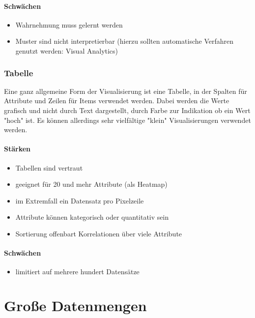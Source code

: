 \paragraph{Schwächen}
	\begin{itemize}
		\item Wahrnehmung muss gelernt werden
		\item Muster sind nicht interpretierbar (hierzu sollten automatische Verfahren genutzt werden: Visual Analytics)
	\end{itemize}

\subsubsection{Tabelle}
	Eine ganz allgemeine Form der Visualisierung ist eine Tabelle, in der Spalten für Attribute und Zeilen für Items verwendet werden. Dabei werden die Werte grafisch und nicht durch Text dargestellt, \bspw durch Farbe zur Indikation ob ein Wert "hoch" ist. Es können allerdings sehr vielfältige "klein" Visualisierungen verwendet werden.

	\paragraph{Stärken}
		\begin{itemize}
			\item Tabellen sind vertraut
			\item geeignet für 20 und mehr Attribute (als Heatmap)
			\item im Extremfall ein Datensatz pro Pixelzeile
			\item Attribute können kategorisch oder quantitativ sein
			\item Sortierung offenbart Korrelationen über viele Attribute
		\end{itemize}

		\paragraph{Schwächen}
			\begin{itemize}
				\item limitiert auf mehrere hundert Datensätze
			\end{itemize}

\section{Große Datenmengen}
	\label{sec:bigdata}

